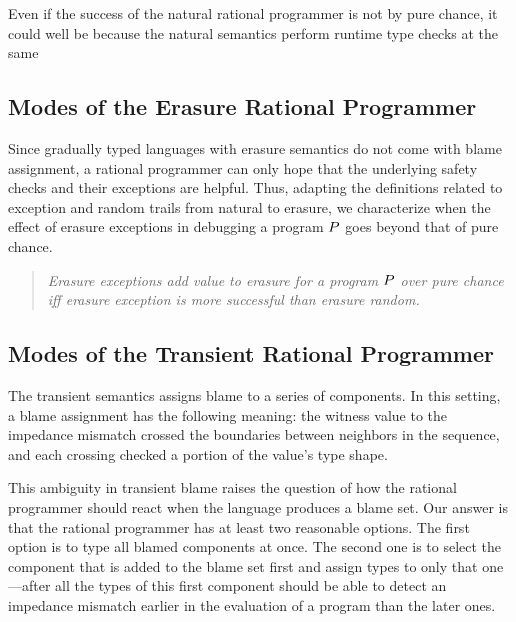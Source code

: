 Even if the success of the natural rational programmer is not by pure chance, it
could well be because the natural semantics perform runtime type checks at the same

\subsection{Modes of the Erasure Rational Programmer} \label{sub:erasure}

 Since gradually typed languages with erasure semantics do not come with
 blame assignment, a rational programmer can only hope that the underlying
 safety checks and their exceptions are helpful.  Thus, adapting the
 definitions related to exception and random trails from natural to
 erasure, we characterize when the effect of erasure exceptions in debugging a
 program $P$ goes beyond that of pure chance. 

\begin{quote}
\it
  Erasure exceptions add value to erasure for a program $P$ over pure chance
  iff erasure exception is more successful than erasure random.
\end{quote}
\noindent


\subsection{Modes of the Transient Rational Programmer} \label{sub:transient}

The transient semantics assigns blame to a series of components. In this setting, a
blame assignment has the following meaning: the witness value to the impedance
mismatch crossed the boundaries between neighbors in the sequence, and each crossing
checked a portion of the value's type shape. 

This ambiguity in transient blame raises the question of how the rational programmer
should react when the language produces a blame set. Our answer is that the rational
programmer has at least two reasonable options.  The first option is to type all
blamed components at once. The second one is to select the component that is added
to the blame set first and assign types to only that one---after all the types of
this first component should be able to detect an impedance mismatch earlier in the
evaluation of a program than the later ones.

